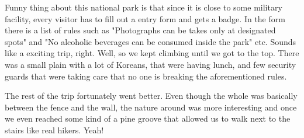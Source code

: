 \begin{post}
\begin{content}
Funny thing about this national park is that since it is close to some military facility, every visitor has to fill out a entry form and gets a badge. In the form there is a list of rules such as "Photographs can be takes only at designated spots" and "No alcoholic beverages can be consumed inside the park" etc. Sounds like a exciting trip, right. Well, so we kept climbing until we got to the top. There was a small plain with a lot of Koreans, that were having lunch, and few security guards that were taking care that no one is breaking the aforementioned rules.


The rest of the trip fortunately went better. Even though the whole was basically between the fence and the wall, the nature around was more interesting and once we even reached some kind of a pine groove that allowed us to walk next to the stairs like real hikers. Yeah!

\begin{figure}[h]
\centering
{}
\end{figure}



\end{content}
\end{post}
